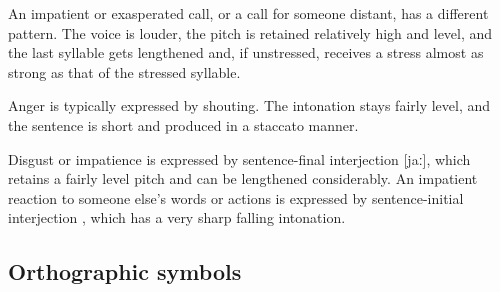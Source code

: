 
An impatient or exasperated call, or a call for someone distant, has a different pattern.  The voice is louder, the pitch is retained relatively high and level, and the last syllable gets lengthened and, if unstressed, receives a stress almost as strong as that of the stressed syllable.

 


Anger is typically expressed by shouting.  The intonation stays fairly level, and the sentence is short and produced in a staccato manner.

Disgust or impatience is expressed by sentence-final interjection  [jaː], which retains a fairly level pitch and can be lengthened considerably.  An impatient reaction to someone else's words or actions is expressed by sentence-initial interjection , which has a very sharp falling intonation.







\subsection{Orthographic symbols}


